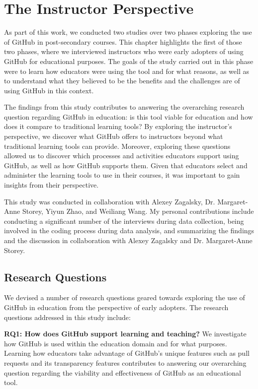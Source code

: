 \chapter{The Instructor Perspective}
As part of this work, we conducted two studies over two phases exploring the use of GitHub in post-secondary courses. This chapter highlights the first of those two phases, where we interviewed instructors who were early adopters of using GitHub for educational purposes. The goals of the study carried out in this phase were to learn how educators were using the tool and for what reasons, as well as to understand what they believed to be the benefits and the challenges are of using GitHub in this context.

The findings from this study contributes to answering the overarching research question regarding GitHub in education: is this tool viable for education and how does it compare to traditional learning tools? By exploring the instructor's perspective, we discover what GitHub offers to instructors beyond what traditional learning tools can provide. Moreover, exploring these questions allowed us to discover which processes and activities educators support using GitHub, as well as how GitHub supports them. Given that educators select and administer the learning tools to use in their courses, it was important to gain insights from their perspective.

This study was conducted in collaboration with Alexey Zagalsky, Dr. Margaret-Anne Storey, Yiyun Zhao, and Weiliang Wang. My personal contributions include conducting a significant number of the interviews during data collection, being involved in the coding process during data analysis, and summarizing the findings and the discussion in collaboration with Alexey Zagalsky and Dr. Margaret-Anne Storey. %

\section{Research Questions}
We devised a number of research questions geared towards exploring the use of GitHub in education from the perspective of early adopters. The research questions addressed in this study include:

\textbf{RQ1: How does GitHub support learning and teaching?} We investigate how GitHub is used within the education domain and for what purposes. Learning how educators take advantage of GitHub's unique features such as pull requests and its transparency features contributes to answering our overarching question regarding the viability and effectiveness of GitHub as an educational tool. %

